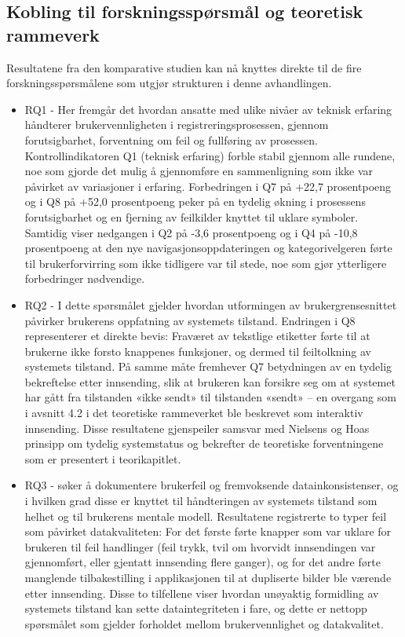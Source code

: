 \subsection{Kobling til forskningsspørsmål og teoretisk rammeverk}
Resultatene fra den komparative studien kan nå knyttes direkte til de fire forskningsspørsmålene som utgjør strukturen i denne avhandlingen.
\begin{itemize}
\item RQ1 - Her fremgår det hvordan ansatte med ulike nivåer av teknisk erfaring håndterer brukervennligheten i registreringsprosessen, gjennom forutsigbarhet, forventning om feil og fullføring av prosessen. Kontrollindikatoren Q1 (teknisk erfaring) forble stabil gjennom alle rundene, noe som gjorde det mulig å gjennomføre en sammenligning som ikke var påvirket av variasjoner i erfaring. Forbedringen i Q7 på +22,7 prosentpoeng og i Q8 på +52,0 prosentpoeng peker på en tydelig økning i prosessens forutsigbarhet og en fjerning av feilkilder knyttet til uklare symboler. Samtidig viser nedgangen i Q2 på -3,6 prosentpoeng og i Q4 på -10,8 prosentpoeng at den nye navigasjonsoppdateringen og kategorivelgeren førte til brukerforvirring som ikke tidligere var til stede, noe som gjør ytterligere forbedringer nødvendige.
\item RQ2 - I dette spørsmålet gjelder hvordan utformingen av brukergrensesnittet påvirker brukerens oppfatning av systemets tilstand. Endringen i Q8 representerer et direkte bevis: Fraværet av tekstlige etiketter førte til at brukerne ikke forsto knappenes funksjoner, og dermed til feiltolkning av systemets tilstand. På samme måte fremhever Q7 betydningen av en tydelig bekreftelse etter innsending, slik at brukeren kan forsikre seg om at systemet har gått fra tilstanden «ikke sendt» til tilstanden «sendt» – en overgang som i avsnitt 4.2 i det teoretiske rammeverket ble beskrevet som interaktiv innsending. Disse resultatene gjenspeiler samsvar med Nielsens og Hoas prinsipp om tydelig systemstatus og bekrefter de teoretiske forventningene som er presentert i teorikapitlet.
\item RQ3 - søker å dokumentere brukerfeil og fremvoksende datainkonsistenser, og i hvilken grad disse er knyttet til håndteringen av systemets tilstand som helhet og til brukerens mentale modell. Resultatene registrerte to typer feil som påvirket datakvaliteten: For det første førte knapper som var uklare for brukeren til feil handlinger (feil trykk, tvil om hvorvidt innsendingen var gjennomført, eller gjentatt innsending flere ganger), og for det andre førte manglende tilbakestilling i applikasjonen til at dupliserte bilder ble værende etter innsending. Disse to tilfellene viser hvordan unøyaktig formidling av systemets tilstand kan sette dataintegriteten i fare, og dette er nettopp spørsmålet som gjelder forholdet mellom brukervennlighet og datakvalitet.

\end{itemize}
